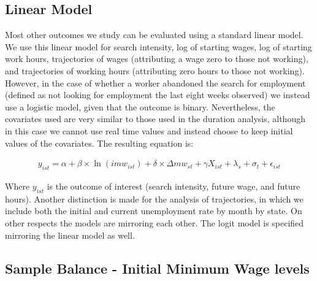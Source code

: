 \documentclass{article}
\begin{document}
\subsection{Linear Model}

Most other outcomes we study can be evaluated using a standard linear model. We use this linear model for search intensity, log of starting wages, log of starting work hours, trajectories of wages (attributing a wage zero to those not working), and trajectories of working hours (attributing zero hours to those not working). However, in the case of whether a worker abandoned the search for employment (defined as not looking for employment the last eight weeks observed) we instead use a logistic model, given that the outcome is binary. Nevertheless, the covariates used are very similar to those used in the duration analysis, although in this case we cannot use real time values and instead choose to keep initial values of the covariates. The resulting equation is:

\begin{align}
y_{ist}=\alpha+\beta\times \ln{(imw_{ist})}+ \delta\times \Delta mw_{st}+ \gamma X_{ist} + \lambda_s+\sigma_t + \epsilon_{ist}
\end{align}

Where $y_{ist}$ is the outcome of interest (search intensity, future wage, and future hours). Another distinction is made for the analysis of trajectories, in which we include both the initial and current unemployment rate by month by state. On other respects the models are mirroring each other. The logit model is specified mirroring the linear model as well. 

\subsection{Sample Balance - Initial Minimum Wage levels}
\end{document}
